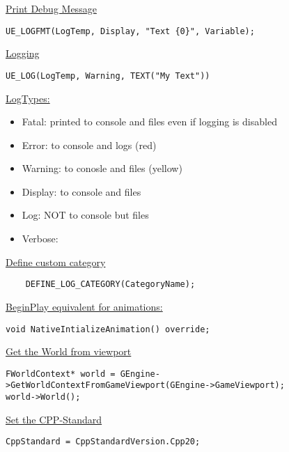     \uline{Print Debug Message}
\begin{lstlisting}
UE_LOGFMT(LogTemp, Display, "Text {0}", Variable);
\end{lstlisting}

    \uline{Logging}
    \begin{lstlisting}
UE_LOG(LogTemp, Warning, TEXT("My Text"))
    \end{lstlisting}
    \uline{LogTypes:}
    \begin{itemize}
        \item Fatal: printed to console and files even if logging is disabled
        \item Error: to console and logs (red)
        \item Warning: to conosle and files (yellow)
        \item Display: to console and files
        \item Log: NOT to console but files
        \item Verbose:
    \end{itemize}
    \uline{Define custom category}
    \begin{lstlisting}
    DEFINE_LOG_CATEGORY(CategoryName);
    \end{lstlisting}
    
\uline{BeginPlay equivalent for animations:}
\begin{lstlisting}
void NativeIntializeAnimation() override;
\end{lstlisting}

\uline{Get the World from viewport}
\begin{lstlisting}
FWorldContext* world = GEngine->GetWorldContextFromGameViewport(GEngine->GameViewport);
world->World();
\end{lstlisting}

\uline{Set the CPP-Standard}
\begin{lstlisting}
CppStandard = CppStandardVersion.Cpp20;
\end{lstlisting}



